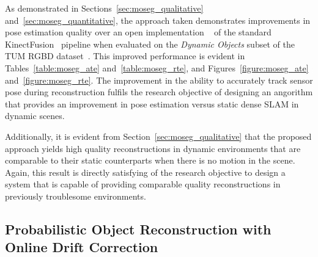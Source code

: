 As demonstrated in Sections~\ref{sec:moseg_qualitative} and~\ref{sec:moseg_quantitative}, the 
approach taken demonstrates improvements in pose estimation quality over an open implementation
~\cite{Prisacariu2014} of the standard KinectFusion~\cite{Newcombe2011} pipeline when evaluated 
on the \textit{Dynamic Objects} subset of the TUM RGBD dataset~\cite{Sturm2012}. This improved 
performance is evident in Tables~\ref{table:moseg_ate} and~\ref{table:moseg_rte}, and 
Figures~\ref{figure:moseg_ate} and~\ref{figure:moseg_rte}. The improvement in the ability to 
accurately track sensor pose during reconstruction fulfils the research objective of designing 
an angorithm that provides an improvement in pose estimation versus static dense SLAM in dynamic 
scenes.

Additionally, it is evident from Section~\ref{sec:moseg_qualitative} that the proposed approach 
yields high quality reconstructions in dynamic environments that are comparable to their static 
counterparts when there is no motion in the scene. Again, this result is directly satisfying of 
the research objective to design a system that is capable of providing comparable quality 
reconstructions in previously troublesome environments.




\subsection{Probabilistic Object Reconstruction with Online Drift Correction}
~\label{subsec:discussion_probobj}


